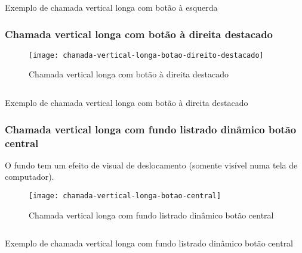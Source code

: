 \begin{code}
    \inputminted[label=chamada-vertical-longa-botao-esquerdo.html]{html}{../RS0001/anexos/chamada-vertical-longa-botao-esquerdo.html}
    \caption{Exemplo de chamada vertical longa com botão à esquerda}\label{RS0001:code:exemplo-chamada-vertical-longa-botao-esquerdo}
\end{code}


\subsubsection{Chamada vertical longa com botão à direita destacado}

\begin{figure}[!ht]
    \centering
    \texttt{[image: chamada-vertical-longa-botao-direito-destacado]}
    \caption{Chamada vertical longa com botão à direita destacado}\label{RS0001:fig:chamada-vertical-longa-botao-direito-destacado}
\end{figure}

\begin{code}
    \inputminted[label=chamada-vertical-longa-botao-direito-destacado.html]{html}{../RS0001/anexos/chamada-vertical-longa-botao-direito-destacado.html}
    \caption{Exemplo de chamada vertical longa com botão à direita destacado}\label{RS0001:code:exemplo-chamada-vertical-longa-botao-direito-destacado}
\end{code}


\subsubsection{Chamada vertical longa com fundo listrado dinâmico botão central}

O fundo tem um efeito de visual de deslocamento (somente visível numa tela de computador).

\begin{figure}[!ht]
    \centering
    \texttt{[image: chamada-vertical-longa-botao-central]}
    \caption{Chamada vertical longa com fundo listrado dinâmico botão central}\label{RS0001:fig:chamada-vertical-longa-botao-central}
\end{figure}

\begin{code}
    \inputminted[label=chamada-vertical-longa-botao-central.html]{html}{../RS0001/anexos/chamada-vertical-longa-botao-central.html}
    \caption{Exemplo de chamada vertical longa com fundo listrado dinâmico botão central}\label{RS0001:code:exemplo-chamada-vertical-longa-botao-central}
\end{code}